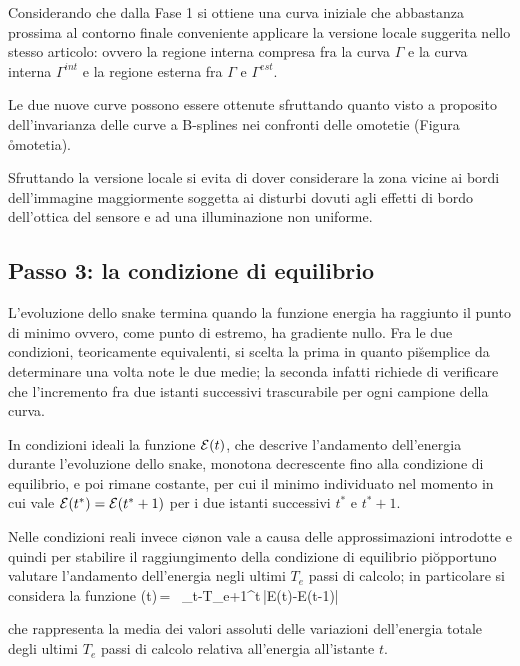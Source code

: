 Considerando che dalla Fase 1 si ottiene una curva iniziale che \e abbastanza
prossima al contorno finale \e conveniente applicare la versione locale suggerita nello stesso
articolo: ovvero la regione interna compresa fra la curva $\Gamma$ e la curva interna
$\Gamma^{int}$ e la regione esterna fra $\Gamma$ e $\Gamma^{est}$.

Le due nuove curve possono essere ottenute sfruttando quanto visto a proposito dell'invarianza
delle curve a B-splines nei confronti delle omotetie (Figura \r{omotetia}).

Sfruttando la versione locale si evita di dover considerare la zona vicine
ai bordi dell'immagine maggiormente soggetta ai disturbi dovuti agli effetti di bordo
dell'ottica del sensore e ad una illuminazione non uniforme.

\subsection{Passo 3: la condizione di equilibrio}

L'evoluzione dello snake termina quando la funzione energia ha raggiunto il punto di minimo
ovvero, come punto di estremo, ha gradiente nullo.
Fra le due condizioni, teoricamente equivalenti, si \e scelta la prima in quanto pi\u
semplice da determinare una volta note le due medie; la seconda infatti richiede di 
verificare che l'incremento fra due istanti successivi \e trascurabile per ogni campione della
curva.

In condizioni ideali la funzione ${\cal E}(t)$, che descrive l'andamento dell'energia durante
l'evoluzione dello snake, \e monotona decrescente fino alla condizione di equilibrio, e
poi rimane costante, per cui il minimo \e individuato nel momento in cui vale
${\cal E}(t^\ast)={\cal E}(t^\ast +1)$ per i due istanti successivi $t^\ast$ e $t^\ast +1$.

Nelle condizioni reali invece ci\o non vale a causa delle approssimazioni introdotte e quindi
per stabilire il raggiungimento della condizione di equilibrio \e pi\u opportuno valutare
l'andamento dell'energia negli ultimi $T_e$ passi di calcolo; in particolare si considera
la funzione
\be
\epsilon(t)\,=\,\,
                \,\sum_{t-T_e+1}^{t}\,|{\cal E}(t)-{\cal E}(t-1)|
\ee

che rappresenta la media dei valori assoluti delle variazioni dell'energia totale degli
ultimi $T_e$ passi di calcolo relativa all'energia all'istante $t$.

